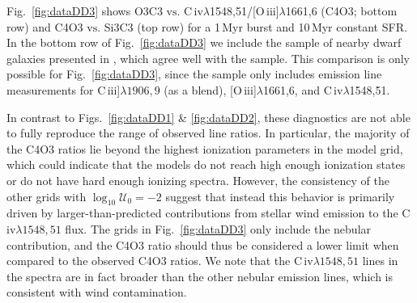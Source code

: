\documentclass[preprint2,trackchanges]{aastex62}
\newcommand{\oiii}{[O\,{\sc iii}]\xspace}
\newcommand{\civ}{C\,{\sc iv}\xspace}
\newcommand{\ciii}{C\,{\sc iii}]\xspace}
\newcommand\vs{\ensuremath{\mathrm{vs.}}\xspace}
\newcommand{\Myr}{$\,$Myr\xspace}
\newcommand{\logten}{\ensuremath{\log_{10}}}
\newcommand{\logUeq}[1]{\ensuremath{\logten \mathcal{U}_0 = #1}}
\begin{document}
Fig.~\ref{fig:dataDD3} shows O3C3 \vs \civ$\lambda$1548,51/\oiii$\lambda$1661,6 (C4O3; bottom row) and C4O3 \vs Si3C3 (top row) for a 1\Myr burst and 10\Myr constant SFR. In the bottom row of Fig.~\ref{fig:dataDD3} we include the sample of nearby dwarf galaxies presented in \citet{Senchyna+2017}, which agree well with the \citet{Berg+2016} sample. This comparison is only possible for Fig.~\ref{fig:dataDD3}, since the \citet{Senchyna+2017} sample only includes emission line measurements for \ciii$\lambda1906,9$ (as a blend), \oiii$\lambda$1661,6, and \civ$\lambda$1548,51.

In contrast to Figs.~\ref{fig:dataDD1} \& \ref{fig:dataDD2}, these diagnostics are not able to fully reproduce the range of observed line ratios. In particular, the majority of the C4O3 ratios lie beyond the highest ionization parameters in the model grid, which could indicate that the models do not reach high enough ionization states or do not have hard enough ionizing spectra. However, the consistency of the other grids with \logUeq{-2} suggest that instead this behavior is primarily driven by larger-than-predicted contributions from stellar wind emission to the \civ$\lambda1548,51$ flux. The grids in Fig.~\ref{fig:dataDD3} only include the nebular contribution, and the C4O3 ratio should thus be considered a lower limit when compared to the observed C4O3 ratios. We note that the \civ$\lambda1548,51$ lines in the \citet{Berg+2016} spectra are in fact broader than the other nebular emission lines, which is consistent with wind contamination.
\end{document}

